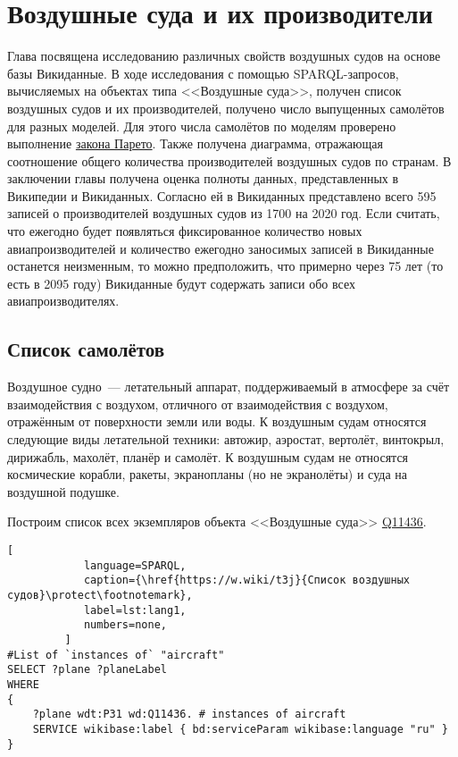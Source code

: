 \chapter{Воздушные суда и их производители}%
\label{ch:aircraft-chapter}

Глава посвящена исследованию различных свойств воздушных судов на основе базы Викиданные. 
В ходе исследования с помощью SPARQL-запросов, вычисляемых на объектах типа <<Воздушные суда>>, 
получен список воздушных судов и их производителей, получено число выпущенных самолётов для разных моделей. Для этого числа самолётов по моделям проверено выполнение \href{https://w.wiki/vDs}{закона Парето}. 
Также получена диаграмма, отражающая соотношение общего количества производителей воздушных судов по странам. 
В заключении главы получена оценка полноты данных, представленных в Википедии и Викиданных. Согласно ей в Викиданных представлено всего 595 записей о производителей воздушных судов из \num{1700} на 2020 год.
Если считать, что ежегодно будет появляться фиксированное количество новых авиапроизводителей и количество ежегодно заносимых записей в Викиданные останется неизменным, то можно предположить, что примерно через 75 лет (то есть в 2095 году) Викиданные будут содержать записи обо всех авиапроизводителях.

\section{Список самолётов}

Воздушное судно~--- летательный аппарат, поддерживаемый в атмосфере за счёт взаимодействия с воздухом, отличного от взаимодействия с воздухом, отражённым от поверхности земли или воды.
К воздушным судам относятся следующие виды летательной техники: автожир, аэростат, вертолёт, винтокрыл, дирижабль, махолёт, планёр и самолёт.
К воздушным судам не относятся космические корабли, ракеты, экранопланы (но не экранолёты) и суда на воздушной подушке. 

Построим список всех экземпляров объекта <<Воздушные суда>> \href{https://www.wikidata.org/wiki/Q11436}{Q11436}.

\newpage 


\begin{lstlisting}[ 
            language=SPARQL, 
            caption={\href{https://w.wiki/t3j}{Список воздушных судов}\protect\footnotemark}, 
            label=lst:lang1, 
            numbers=none,
         ]
#List of `instances of` "aircraft"
SELECT ?plane ?planeLabel
WHERE
{
    ?plane wdt:P31 wd:Q11436. # instances of aircraft
    SERVICE wikibase:label { bd:serviceParam wikibase:language "ru" }
}
\end{lstlisting}


